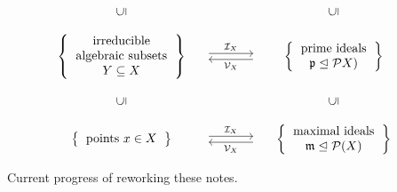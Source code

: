 \begin{theorem}
\begin{enumerate}
\[\begin{matrix}
          \\
            {}
          & {}
          & {}
          \\
            \rotatebox[origin=c]{90}{$\subseteq$}
          & {}
          & \rotatebox[origin=c]{90}{$\subseteq$}
          \\
            {}
          & {}
          & {}
          \\
            \left\{
              \begin{tabular}{c}
                  irreducible \\
                  algebraic subsets \\
                  $Y \subseteq X$
              \end{tabular}
            \right\}
          & \begin{tikzcd}[column sep = large]
                {}
                \arrow[shift left]{r}{\mc{I}_X}
              & {}
                \arrow[shift left]{l}{\mc{V}_X}
            \end{tikzcd}
          & \left\{
              \begin{tabular}{c}
                prime ideals \\
                $\mf{p} \idealleq \mc{P}X)$
              \end{tabular}
            \right\}
          \\
            {}
          & {}
          & {}
          \\
            \rotatebox[origin=c]{90}{$\subseteq$}
          & {}
          & \rotatebox[origin=c]{90}{$\subseteq$}
          \\
            {}
          & {}
          & {}
          \\
            \left\{
              \begin{tabular}{c}
                points $x \in X$
              \end{tabular}
            \right\}
          & \begin{tikzcd}[column sep = large]
                {}
                \arrow[shift left]{r}{\mc{I}_X}
              & {}
                \arrow[shift left]{l}{\mc{V}_X}
            \end{tikzcd}
          & \left\{
              \begin{tabular}{c}
                maximal ideals \\
                $\mf{m} \idealleq \mc{P}(X)$
              \end{tabular}
            \right\}
        \end{matrix}
      \]
  \end{enumerate}
\end{theorem}








\noindent\hrulefill \, Current progress of reworking these notes. \hrulefill




